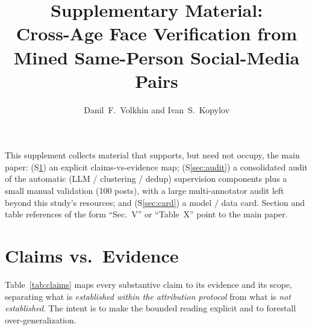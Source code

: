 \documentclass[journal]{IEEEtran}
\begin{document}
\title{Supplementary Material:\\ Cross-Age Face Verification from Mined Same-Person Social-Media Pairs}
\author{Danil~F.~Volkhin and Ivan~S.~Kopylov}
\maketitle

\noindent This supplement collects material that supports, but need not occupy, the main paper:
(S\ref{sec:claims}) an explicit claims-vs-evidence map; (S\ref{sec:audit}) a consolidated audit of
the automatic (LLM / clustering / dedup) supervision components plus a small manual validation
(100 posts), with a large multi-annotator audit left beyond this study's resources; and
(S\ref{sec:card}) a model / data card. Section and table
references of the form ``Sec.~V'' or ``Table~X'' point to the main paper.

\section{Claims vs.\ Evidence}\label{sec:claims}
Table~\ref{tab:claims} maps every substantive claim to its evidence and its scope, separating what
is \emph{established within the attribution protocol} from what is \emph{not established}. The intent
is to make the bounded reading explicit and to forestall over-generalization.
\end{document}
